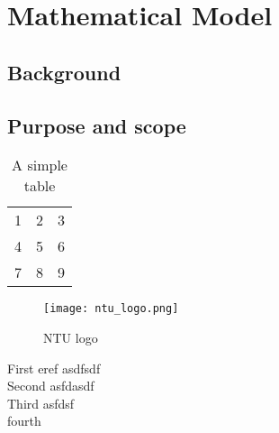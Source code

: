 \chapter{Mathematical Model}
\section{Background}
\section{Purpose and scope }


\begin{table}[h!]
  \begin{center}
    \begin{tabular}{| l c r |}
    \hline
    1 & 2 & 3 \\
    4 & 5 & 6 \\
    7 & 8 & 9 \\
    \hline
    \end{tabular}
  \end{center}
  \caption{A simple table}
\end{table}

\begin{figure}[h!]  
  \centering
    \texttt{[image: ntu\_logo.png]}
  \caption{NTU logo}
\end{figure}


First eref \cite{Hao14} asdfsdf \\

Second \cite{Beyl11} asfdasdf \\

Third \cite{Bona05} asfdsf\\

fourth \cite{Ohi91} \\

